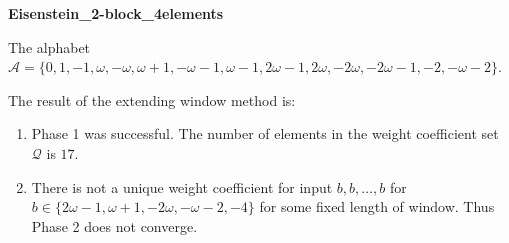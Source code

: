\begin{exmp}
\textbf{ Eisenstein\_2-block\_4elements }

\label{ex:Eisenstein2-block4elements}

The alphabet $\mathcal{A} =\{0, 1, -1, \omega, -\omega, \omega + 1, -\omega - 1, \omega - 1, 2\omega - 1, 2\omega, -2\omega, -2\omega - 1, -2, -\omega - 2\}$.

The result of the extending window method is:
\begin{enumerate}
    \item Phase 1 was successful.
The number of elements in the weight coefficient set $\mathcal{Q}$ is $17$.

    \item There is not a unique weight coefficient for input $b,b,\dots,b$ for $b\in\{2\omega - 1, \omega + 1, -2\omega, -\omega - 2, -4\}$ for some fixed length of window. Thus Phase 2 does not converge.

\end{enumerate}
\end{exmp}
